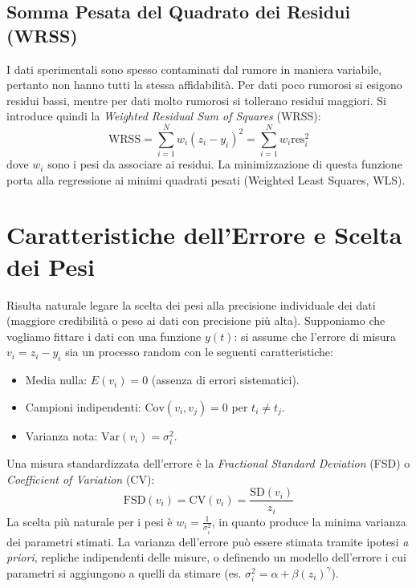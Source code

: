 \subsection{Somma Pesata del Quadrato dei Residui (WRSS)}
I dati sperimentali sono spesso contaminati dal rumore in maniera variabile, pertanto non hanno tutti la stessa affidabilità. Per dati poco rumorosi si esigono residui bassi, mentre per dati molto rumorosi si tollerano residui maggiori. Si introduce quindi la \textit{Weighted Residual Sum of Squares} (WRSS):
\begin{equation}
    \text{WRSS} = \sum_{i=1}^{N} w_i (z_i - y_i)^2 = \sum_{i=1}^{N} w_i \text{res}_i^2
\end{equation}
dove $w_i$ sono i pesi da associare ai residui. La minimizzazione di questa funzione porta alla regressione ai minimi quadrati pesati (Weighted Least Squares, WLS).

\section{Caratteristiche dell'Errore e Scelta dei Pesi}
Risulta naturale legare la scelta dei pesi alla precisione individuale dei dati (maggiore
credibilità o peso ai dati con precisione più alta). Supponiamo che vogliamo fittare i dati con una funzione $y(t)$: si assume che l'errore di misura $v_i = z_i - y_i$ sia un processo random con le seguenti caratteristiche:
\begin{itemize}
    \item Media nulla: $E(v_i) = 0$ (assenza di errori sistematici).
    \item Campioni indipendenti: $\text{Cov}(v_i, v_j) = 0$ per $t_i \neq t_j$.
    \item Varianza nota: $\text{Var}(v_i) = \sigma_i^2$.
\end{itemize}

\noindent Una misura standardizzata dell'errore è la \textit{Fractional Standard Deviation} (FSD) o \textit{Coefficient of Variation} (CV):
\begin{equation}
    \text{FSD}(v_i) = \text{CV}(v_i) = \frac{\text{SD}(v_i)}{z_i}
\end{equation}
La scelta più naturale per i pesi è $w_i = \frac{1}{\sigma_i^2}$, in quanto produce la minima varianza dei parametri stimati. La varianza dell'errore può essere stimata tramite ipotesi \textit{a priori}, repliche indipendenti delle misure, o definendo un modello dell'errore i cui parametri si aggiungono a quelli da stimare (es. $\sigma_i^2 = \alpha + \beta (z_i)^\gamma$).

